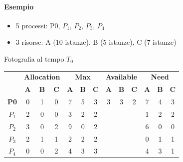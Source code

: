 \documentclass[a4paper]{article}
\begin{document}
\paragraph{Esempio}
\begin{itemize}
    \item 5 processi: P0, $P_1$, $P_2$, $P_3$, $P_4$
    \item 3 risorse: A (10 istanze), B (5 istanze), C (7 istanze)
\end{itemize}
Fotografia al tempo $T_0$
\begin{table}[htb]
    \centering
    \begin{tabular}{c|ccc|ccc|ccc|ccc|}
        \cline{2-13}
                                             & \multicolumn{3}{c|}{\textbf{Allocation}} & \multicolumn{3}{c|}{\textbf{Max}} & \multicolumn{3}{c|}{\textbf{Available}} & \multicolumn{3}{c|}{\textbf{Need}}                                                                                                         \\ \cline{2-13}
                                             & \textbf{A}                               & \textbf{B}                        & \textbf{C}                              & \textbf{A}                         & \textbf{B} & \textbf{C} & \textbf{A} & \textbf{B} & \textbf{C} & \textbf{A} & \textbf{B} & \textbf{C} \\ \hline
        \multicolumn{1}{|c|}{\textbf{P0}}    & 0                                        & 1                                 & 0                                       & 7                                  & 5          & 3          & 3          & 3          & 2          & 7          & 4          & 3          \\
        \multicolumn{1}{|c|}{\textbf{$P_1$}} & 2                                        & 0                                 & 0                                       & 3                                  & 2          & 2          &            &            &            & 1          & 2          & 2          \\
        \multicolumn{1}{|c|}{\textbf{$P_2$}} & 3                                        & 0                                 & 2                                       & 9                                  & 0          & 2          &            &            &            & 6          & 0          & 0          \\
        \multicolumn{1}{|c|}{\textbf{$P_3$}} & 2                                        & 1                                 & 1                                       & 2                                  & 2          & 2          &            &            &            & 0          & 1          & 1          \\
        \multicolumn{1}{|c|}{\textbf{$P_4$}} & 0                                        & 0                                 & 2                                       & 4                                  & 3          & 3          &            &            &            & 4          & 3          & 1          \\ \hline
    \end{tabular}
\end{table}
\end{document}
